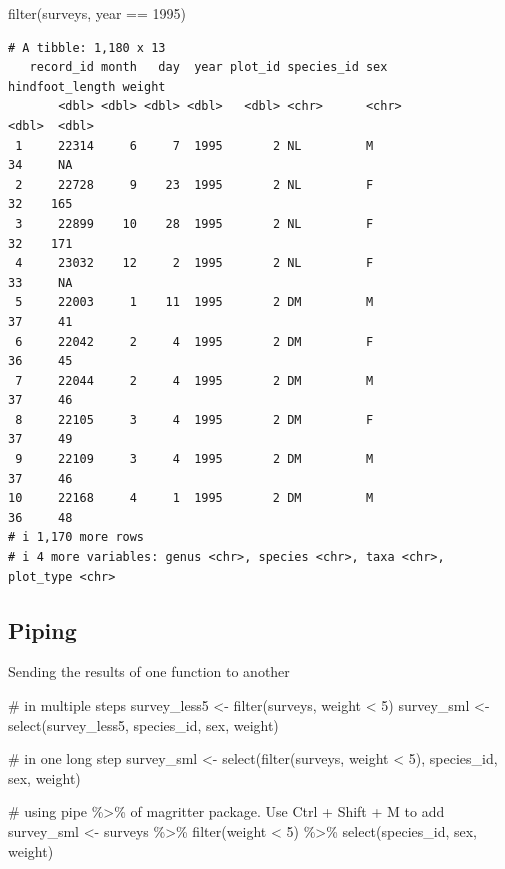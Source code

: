 \documentclass[
  letterpaper,
  DIV=11,
  numbers=noendperiod]{scrreprt}
\newenvironment{Shaded}{\begin{snugshade}}{\end{snugshade}}
\newcommand{\CommentTok}[1]{\textcolor[rgb]{0.37,0.37,0.37}{#1}}
\newcommand{\DecValTok}[1]{\textcolor[rgb]{0.68,0.00,0.00}{#1}}
\newcommand{\FunctionTok}[1]{\textcolor[rgb]{0.28,0.35,0.67}{#1}}
\newcommand{\NormalTok}[1]{\textcolor[rgb]{0.00,0.23,0.31}{#1}}
\newcommand{\OtherTok}[1]{\textcolor[rgb]{0.00,0.23,0.31}{#1}}
\newcommand{\SpecialCharTok}[1]{\textcolor[rgb]{0.37,0.37,0.37}{#1}}
\begin{document}
\begin{Shaded}
\begin{Highlighting}[]
\FunctionTok{filter}\NormalTok{(surveys, year }\SpecialCharTok{==} \DecValTok{1995}\NormalTok{)}
\end{Highlighting}
\end{Shaded}

\begin{verbatim}
# A tibble: 1,180 x 13
   record_id month   day  year plot_id species_id sex   hindfoot_length weight
       <dbl> <dbl> <dbl> <dbl>   <dbl> <chr>      <chr>           <dbl>  <dbl>
 1     22314     6     7  1995       2 NL         M                  34     NA
 2     22728     9    23  1995       2 NL         F                  32    165
 3     22899    10    28  1995       2 NL         F                  32    171
 4     23032    12     2  1995       2 NL         F                  33     NA
 5     22003     1    11  1995       2 DM         M                  37     41
 6     22042     2     4  1995       2 DM         F                  36     45
 7     22044     2     4  1995       2 DM         M                  37     46
 8     22105     3     4  1995       2 DM         F                  37     49
 9     22109     3     4  1995       2 DM         M                  37     46
10     22168     4     1  1995       2 DM         M                  36     48
# i 1,170 more rows
# i 4 more variables: genus <chr>, species <chr>, taxa <chr>, plot_type <chr>
\end{verbatim}

\subsection{Piping}\label{piping}

Sending the results of one function to another

\begin{Shaded}
\begin{Highlighting}[]
\CommentTok{\# in multiple steps}
\NormalTok{survey\_less5 }\OtherTok{\textless{}{-}} \FunctionTok{filter}\NormalTok{(surveys, weight }\SpecialCharTok{\textless{}} \DecValTok{5}\NormalTok{)}
\NormalTok{survey\_sml }\OtherTok{\textless{}{-}} \FunctionTok{select}\NormalTok{(survey\_less5, species\_id, sex, weight)}

\CommentTok{\# in one long step}
\NormalTok{survey\_sml }\OtherTok{\textless{}{-}} \FunctionTok{select}\NormalTok{(}\FunctionTok{filter}\NormalTok{(surveys, weight }\SpecialCharTok{\textless{}} \DecValTok{5}\NormalTok{), species\_id, sex, weight)}

\CommentTok{\# using pipe \%\textgreater{}\% of magritter package.  Use Ctrl + Shift + M to add}
\NormalTok{survey\_sml }\OtherTok{\textless{}{-}}\NormalTok{ surveys }\SpecialCharTok{\%\textgreater{}\%}
    \FunctionTok{filter}\NormalTok{(weight }\SpecialCharTok{\textless{}} \DecValTok{5}\NormalTok{) }\SpecialCharTok{\%\textgreater{}\%}
    \FunctionTok{select}\NormalTok{(species\_id, sex, weight)}
\end{Highlighting}
\end{Shaded}
\end{document}
